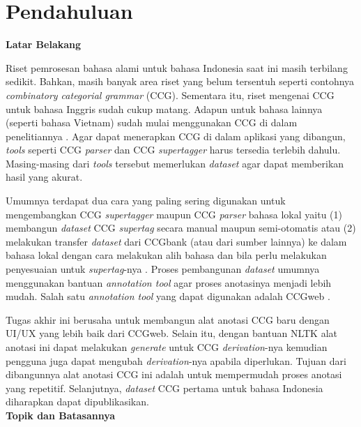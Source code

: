 
\section{Pendahuluan}

\noindent\textbf{Latar Belakang}

Riset pemrosesan bahasa alami untuk bahasa Indonesia saat ini masih terbilang sedikit.
Bahkan, masih banyak area riset yang belum tersentuh seperti contohnya
\textit{combinatory categorial grammar} (CCG).
Sementara itu, riset mengenai CCG untuk bahasa Inggris sudah cukup matang.
Adapun untuk bahasa lainnya (seperti bahasa Vietnam) sudah mulai menggunakan CCG di dalam
penelitiannya \citep{nguyen2019vietnamese}.
Agar dapat menerapkan CCG di dalam aplikasi yang dibangun, \textit{tools} seperti
CCG \textit{parser} dan CCG \textit{supertagger} harus tersedia terlebih dahulu.
Masing-masing dari \textit{tools} tersebut memerlukan \textit{dataset} agar dapat memberikan
hasil yang akurat.

Umumnya terdapat dua cara yang paling sering digunakan untuk mengembangkan CCG \textit{supertagger}
maupun CCG \textit{parser} bahasa lokal yaitu (1) membangun \textit{dataset} CCG \textit{supertag}
secara manual maupun semi-otomatis atau (2) melakukan transfer \textit{dataset} dari CCGbank
(atau dari sumber lainnya) ke dalam bahasa lokal dengan cara melakukan alih bahasa dan bila perlu
melakukan penyesuaian untuk \textit{supertag}-nya \citep{hockenmaier-steedman-2007-ccgbank}.
Proses pembangunan \textit{dataset} umumnya menggunakan bantuan \textit{annotation tool} agar
proses anotasinya menjadi lebih mudah.
Salah satu \textit{annotation tool} yang dapat digunakan adalah
CCGweb \citep{evang-etal-2019-ccgweb}.

Tugas akhir ini berusaha untuk membangun alat anotasi CCG baru dengan
UI/UX yang lebih baik dari CCGweb.
Selain itu, dengan bantuan NLTK alat anotasi ini dapat melakukan \textit{generate} untuk
CCG \textit{derivation}-nya kemudian pengguna juga dapat mengubah \textit{derivation}-nya
apabila diperlukan.
Tujuan dari dibangunnya alat anotasi CCG ini adalah untuk mempermudah proses anotasi yang
repetitif.
Selanjutnya, \textit{dataset} CCG pertama untuk bahasa Indonesia diharapkan dapat dipublikasikan.
\\


\noindent\textbf{Topik dan Batasannya}

